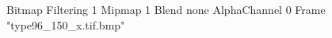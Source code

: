 {Bitmap
	{Filtering 1}
	{Mipmap 1}
	{Blend none}
	{AlphaChannel 0}
	{Frame "type96_150_x.tif.bmp"}
}
